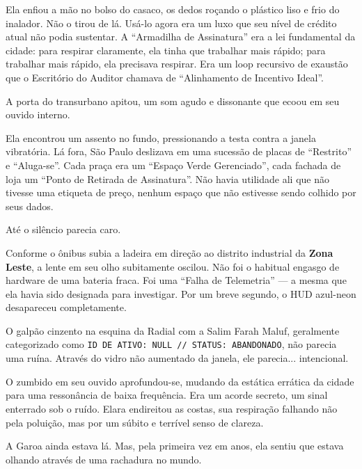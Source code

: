 Ela enfiou a mão no bolso do casaco, os dedos roçando o plástico liso e frio do inalador. Não o tirou de lá. Usá-lo agora era um luxo que seu nível de crédito atual não podia sustentar. A ``Armadilha de Assinatura'' era a lei fundamental da cidade: para respirar claramente, ela tinha que trabalhar mais rápido; para trabalhar mais rápido, ela precisava respirar. Era um loop recursivo de exaustão que o Escritório do Auditor chamava de ``Alinhamento de Incentivo Ideal''.

A porta do transurbano apitou, um som agudo e dissonante que ecoou em seu ouvido interno.


Ela encontrou um assento no fundo, pressionando a testa contra a janela vibratória. Lá fora, São Paulo deslizava em uma sucessão de placas de ``Restrito'' e ``Aluga-se''. Cada praça era um ``Espaço Verde Gerenciado'', cada fachada de loja um ``Ponto de Retirada de Assinatura''. Não havia utilidade ali que não tivesse uma etiqueta de preço, nenhum espaço que não estivesse sendo colhido por seus dados.

Até o silêncio parecia caro.

Conforme o ônibus subia a ladeira em direção ao distrito industrial da \textbf{Zona Leste}, a lente em seu olho subitamente oscilou. Não foi o habitual engasgo de hardware de uma bateria fraca. Foi uma ``Falha de Telemetria'' --- a mesma que ela havia sido designada para investigar. Por um breve segundo, o HUD azul-neon desapareceu completamente.

O galpão cinzento na esquina da Radial com a Salim Farah Maluf, geralmente categorizado como \texttt{ID DE ATIVO: NULL // STATUS: ABANDONADO}, não parecia uma ruína. Através do vidro não aumentado da janela, ele parecia... intencional.

O zumbido em seu ouvido aprofundou-se, mudando da estática errática da cidade para uma ressonância de baixa frequência. Era um acorde secreto, um sinal enterrado sob o ruído. Elara endireitou as costas, sua respiração falhando não pela poluição, mas por um súbito e terrível senso de clareza.

A Garoa ainda estava lá. Mas, pela primeira vez em anos, ela sentiu que estava olhando através de uma rachadura no mundo.
